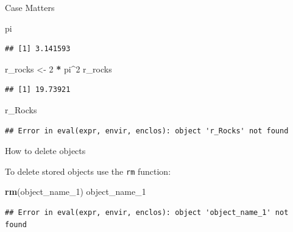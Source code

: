 \documentclass[ignorenonframetext,]{beamer}
\newenvironment{Shaded}{\begin{snugshade}}{\end{snugshade}}
\newcommand{\DecValTok}[1]{\textcolor[rgb]{0.00,0.00,0.81}{#1}}
\newcommand{\KeywordTok}[1]{\textcolor[rgb]{0.13,0.29,0.53}{\textbf{#1}}}
\newcommand{\NormalTok}[1]{#1}
\newcommand{\OperatorTok}[1]{\textcolor[rgb]{0.81,0.36,0.00}{\textbf{#1}}}
\newcommand{\StringTok}[1]{\textcolor[rgb]{0.31,0.60,0.02}{#1}}
\begin{document}
\begin{frame}[fragile]{Case Matters}
\protect\hypertarget{case-matters}{}

\begin{Shaded}
\begin{Highlighting}[]
\NormalTok{pi}
\end{Highlighting}
\end{Shaded}

\begin{verbatim}
## [1] 3.141593
\end{verbatim}

\begin{Shaded}
\begin{Highlighting}[]
\NormalTok{r_rocks <-}\StringTok{ }\DecValTok{2} \OperatorTok{*}\StringTok{ }\NormalTok{pi}\OperatorTok{^}\DecValTok{2}
\NormalTok{r_rocks}
\end{Highlighting}
\end{Shaded}

\begin{verbatim}
## [1] 19.73921
\end{verbatim}

\begin{Shaded}
\begin{Highlighting}[]
\NormalTok{r_Rocks}
\end{Highlighting}
\end{Shaded}

\begin{verbatim}
## Error in eval(expr, envir, enclos): object 'r_Rocks' not found
\end{verbatim}

\end{frame}

\begin{frame}[fragile]{How to delete objects}
\protect\hypertarget{how-to-delete-objects}{}

To delete stored objects use the \texttt{rm} function:

\begin{Shaded}
\begin{Highlighting}[]
\KeywordTok{rm}\NormalTok{(object_name_}\DecValTok{1}\NormalTok{)}
\NormalTok{object_name_}\DecValTok{1}
\end{Highlighting}
\end{Shaded}

\begin{verbatim}
## Error in eval(expr, envir, enclos): object 'object_name_1' not found
\end{verbatim}

\end{frame}
\end{document}
